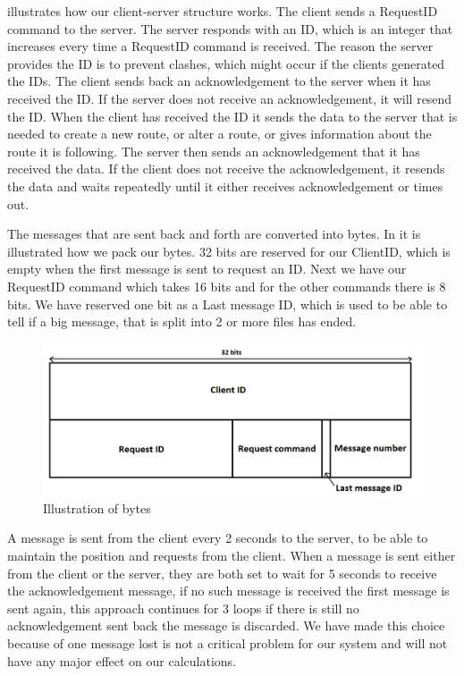  illustrates how our client-server structure works. The client sends a RequestID command to the server. The server responds with an ID, which is an integer that increases every time a RequestID command is received. The reason the server provides the ID is to prevent clashes, which might occur if the clients generated the IDs. The client sends back an acknowledgement to the server when it has received the ID. If the server does not receive an acknowledgement, it will resend the ID. When the client has received the ID it sends the data to the server that is needed to create a new route, or alter a route, or gives information about the route it is following. The server then sends an acknowledgement that it has received the data. If the client does not receive the acknowledgement, it resends the data and waits repeatedly until it either receives acknowledgement or times out.

The messages that are sent back and forth are converted into bytes. In
 it is illustrated how we pack our bytes. 32 bits are reserved for our ClientID, which is empty when the first message is sent to request an ID. Next we have our RequestID command which takes 16 bits and for the other commands there is 8 bits. We have reserved one bit as a Last message ID, which is used to be able to tell if a big message, that is split into 2 or more files has ended.

\begin{figure}[h!]
  \centering
    \includegraphics[width=1\textwidth]{figures/bytesclientserver.png}
    \caption{Illustration of bytes}
    \label{fig:bytesclientserver}
\end{figure}

A message is sent from the client every 2 seconds to the server, to be able to maintain the position and requests from the client.
When a message is sent either from the client or the server, they are both set to wait for 5 seconds to receive the acknowledgement message, if no such message is received the first message is sent again, this approach continues for 3 loops if there is still no acknowledgement sent back the message is discarded. We have made this choice because of one message lost is not a critical problem for our system and will not have any major effect on our calculations.		
